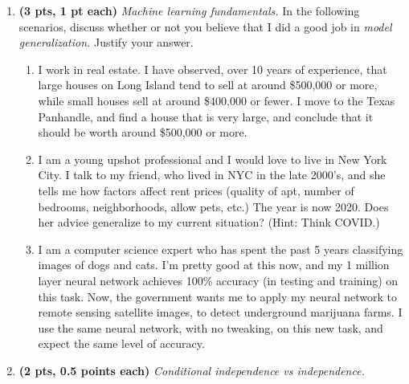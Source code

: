 \documentclass{article}
\newcommand{\showpoints}[1]{\textbf{(#1)}}
\begin{document}
\begin{enumerate}
\item \showpoints{3 pts, 1 pt each} \emph{Machine learning fundamentals.} In the following scenarios, discuss whether or not you believe that I did a good job in \emph{model generalization.} Justify your answer.



\begin{enumerate}
\item I work in real estate. I have observed, over 10 years of experience, that large houses on Long Island tend to sell at around \$500,000 or more, while small houses sell at around \$400,000 or fewer. I move to the Texas Panhandle, and find a house that is very large, and conclude that it should be worth around \$500,000 or more.



\item I am a young upshot professional and I would love to live in New York City. I talk to my friend, who lived in NYC in the late 2000's, and she tells me    how factors affect rent prices (quality of apt, number of bedrooms, neighborhoods, allow pets, etc.)   The year is now 2020. Does her advice generalize to my current situation? (Hint: Think COVID.)



\item I am a computer science expert who has spent the past 5 years classifying images of dogs and cats. I'm pretty good at this now, and my 1 million layer neural network achieves 100\% accuracy (in testing and training) on this task. Now, the government wants me to apply my neural network to remote sensing satellite images, to detect underground marijuana farms. I use the same neural network, with no tweaking, on this new task, and expect the same level of accuracy.

\end{enumerate}




\item \showpoints{2 pts, 0.5 points each} \emph{Conditional independence vs independence.} 


\end{enumerate}
\end{document}
